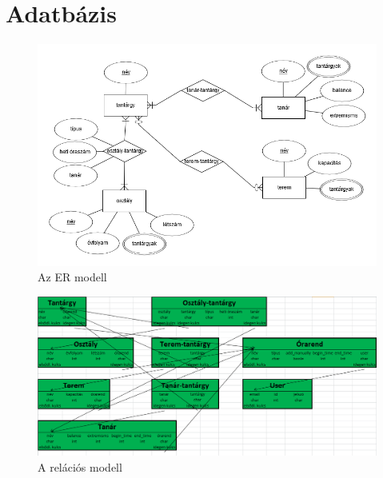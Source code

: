 \documentclass[12pt,a4paper]{report}
\begin{document}
\section{Adatbázis}

\begin{figure}
\includegraphics[width=\linewidth]{images/ermodell.png}
\caption{Az ER modell}
\end{figure}

\begin{figure}
\includegraphics[width=\linewidth]{images/relmodell.png}
\caption{A relációs modell}
\end{figure}
\end{document}
